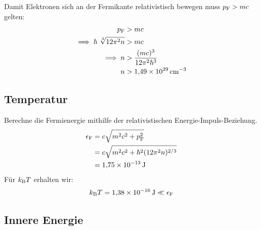 Damit Elektronen sich an der Fermikante relativistisch bewegen muss $p_{\text F} > mc$ gelten:
\begin{align*}
p_{\text F} &> mc \\
\implies \hbar \ \sqrt[3]{12\pi^2 n} &> mc \\
\implies n &> \frac{(mc)^3}{12\pi^2\hbar^3} \\
n &> \SI{1.49e29}{\centi \meter}^{-3}
\end{align*}

\subsection{Temperatur}
Berechne die Fermienergie mithilfe der relativistischen Energie-Impuls-Beziehung.
\begin{align*}
\epsilon_{\text F} &= c \sqrt{m^2c^2+p_{\text F}^2} \\
&= c \sqrt{m^2c^2+\hbar^2 (12\pi^2 n)^{2/3}} \\
&= \SI{1.75e-13}{\joule}
\end{align*}
Für $k_{\text B}T$ erhalten wir:
\begin{align*}
k_{\text B}T = \SI{1.38e-16}{\joule} \ll \epsilon_{\text F}
\end{align*}

\subsection{Innere Energie}

\IfFileExists{\bibliographyfile}{
    \printbibliography
}{}



